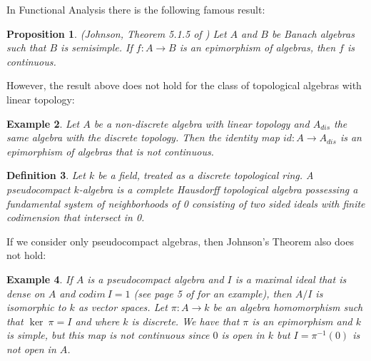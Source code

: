 \documentclass[a4paper,12pt]{article}
\newtheorem{prop}{Proposition}[section]
\newtheorem{defi}[prop]{Definition}
\newtheorem{ex}[prop]{Example}
\theoremstyle{bloco}
\begin{document}
In Functional Analysis there is the following famous result:

\begin{prop}(Johnson, Theorem 5.1.5 of \cite{Dal}) Let $A$ and $B$ be Banach algebras such that $B$ is semisimple. If $f: A \rightarrow B$ is an epimorphism of algebras, then $f$ is continuous. 
\end{prop}

However, the result above does not hold for the class of topological algebras with linear topology:

\begin{ex}\label{example1}Let $A$ be a non-discrete algebra with linear topology and $A_{dis}$ the same algebra with the discrete topology. Then the identity map ${id: A \rightarrow A_{dis}}$ is an epimorphism of algebras that is not continuous.
\end{ex}

\begin{defi}Let $k$ be a field, treated as a discrete topological ring. A pseudocompact $k$-algebra is a complete Hausdorff topological algebra possessing a fundamental system of neighborhoods of 0 consisting of two sided ideals with finite codimension that intersect in 0.
\end{defi}

If we consider only pseudocompact algebras, then Johnson's Theorem also does not hold:

\begin{ex}\label{example2}If $A$ is a pseudocompact algebra and $I$ is a maximal ideal that is dense on $A$ and $codim \ I = 1$ (see page 5 of \cite{IM} for an example), then  $A/I$ is isomorphic to $k$ as vector spaces. Let $\pi: A \rightarrow k$ be an algebra homomorphism such that $\ker \ \pi = I$ and where $k$ is discrete. We have that $\pi$ is an epimorphism and $k$ is simple, but this map is not continuous since $0$ is open in $k$ but $I = \pi^{-1}(0)$ is not open in $A$.
\end{ex}
\end{document}
